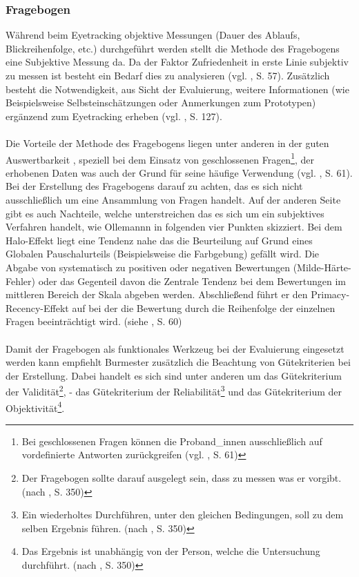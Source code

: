 \documentclass[Bachelorarbeit.tex]{subfiles}
\begin{document}
\subsubsection{Fragebogen}
\label{FragebogenEvaluation}


Während beim Eyetracking objektive Messungen  (Dauer des Ablaufs, Blickreihenfolge, etc.) durchgeführt werden stellt die Methode des Fragebogens eine Subjektive Messung da.
Da der Faktor Zufriedenheit in erste Linie subjektiv zu messen ist besteht ein Bedarf dies zu analysieren (vgl. \cite{Ollermann2007}, S. 57).
Zusätzlich besteht die Notwendigkeit, aus Sicht der Evaluierung, weitere Informationen (wie Beispielsweise Selbsteinschätzungen oder Anmerkungen zum Prototypen) ergänzend zum Eyetracking erheben (vgl. \cite{Laugwitz2006}, S. 127). \\
\\
Die Vorteile der Methode des Fragebogens liegen unter anderen in der guten Auswertbarkeit , speziell bei dem Einsatz von geschlossenen Fragen\footnote{Bei geschlossenen Fragen können die Proband\_innen ausschließlich auf vordefinierte Antworten zurückgreifen (vgl. \cite{Ollermann2007}, S. 61)}, der erhobenen Daten was auch der Grund für seine häufige Verwendung (vgl. \cite{Ollermann2007}, S. 61). 
Bei der Erstellung des Fragebogens darauf zu achten, das es sich nicht ausschließlich um eine Ansammlung von Fragen handelt.
Auf der anderen Seite gibt es auch Nachteile, welche unterstreichen das es sich um ein subjektives Verfahren handelt, wie Ollemannn in folgenden vier Punkten skizziert.
Bei dem Halo-Effekt liegt eine Tendenz nahe das die Beurteilung auf Grund eines Globalen Pauschalurteils (Beispielsweise die Farbgebung) gefällt wird.
Die Abgabe von systematisch zu positiven oder negativen Bewertungen (Milde-Härte-Fehler) oder das Gegenteil davon die Zentrale Tendenz bei dem Bewertungen im mittleren Bereich der Skala abgeben werden.
Abschließend führt er den Primacy-Recency-Effekt auf bei der die Bewertung durch die Reihenfolge der einzelnen Fragen beeinträchtigt wird. (siehe \cite{Ollermann2007}, S. 60)\\
\\
Damit der Fragebogen als funktionales Werkzeug bei der Evaluierung eingesetzt werden kann empfiehlt Burmester zusätzlich die Beachtung von Gütekriterien bei der Erstellung. 
Dabei handelt es sich sind unter anderen um das Gütekriterium der Validität\footnote{Der Fragebogen sollte darauf ausgelegt sein, dass zu messen was er vorgibt. (nach \cite{Burmester}, S. 350)}, - das Gütekriterium der Reliabilität\footnote{Ein wiederholtes Durchführen, unter den gleichen Bedingungen, soll zu dem selben Ergebnis führen. (nach \cite{Burmester}, S. 350)} und das Gütekriterium der Objektivität\footnote{Das Ergebnis ist unabhängig von der Person, welche die Untersuchung durchführt. (nach \cite{Burmester}, S. 350)}. \\
\end{document}
